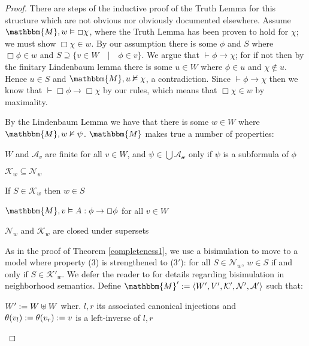 \begin{proof}
  
  
  There are steps of the inductive proof of the Truth Lemma for this structure
  which are not obvious nor obviously documented elsewhere.  Assume
  $\mathbbm{M}, w \vDash \Box \chi$, where the Truth Lemma has been proven to
  hold for $\chi$; we must show $\Box \chi \in w$.  By our assumption there
  is some $\phi$ and $S$ where $\Box \phi \in w$ and $S \supseteq \{v \in W
  \hspace{1em} | \hspace{1em} \phi \in v\}$.  We argue that $\vdash \phi
  \rightarrow \chi$; for if not then by the finitary Lindenbaum lemma there is
  some $u \in W$ where $\phi \in u$ and $\chi \nin u$.  Hence $u \in S$ and
  $\mathbbm{M}, u \nvDash \chi$, a contradiction.  Since $\vdash \phi
  \rightarrow \chi$ then we know that $\vdash \Box \phi \rightarrow \Box \chi$
  by our rules, which means that $\Box \chi \in w$ by maximality.
  
  
  
  By the Lindenbaum Lemma we have that there is some $w \in W$ where
  $\mathbbm{M}, w \nvDash \psi$.  $\mathbbm{M}$ makes true a number of
  properties:
  \begin{enumeratenumeric}
    \item $W$ and $\mathcal{A}_v$ are finite for all $v \in W$, and $\psi \in
    \bigcup \mathcal{A_w}$ only if $\psi$ is a subformula of $\phi$
    
    \item $\mathcal{K}_w \subseteq \mathcal{N}_w$
    
    \item If $S \in \mathcal{K}_w$ then $w \in S$
    
    \item $\mathbbm{M}, v \vDash A : \phi \rightarrow \Box \phi$ for all $v
    \in W$
    
    \item $\mathcal{N}_w$ and $\mathcal{K}_w$ are closed under supersets
  \end{enumeratenumeric}
  
  
  As in the proof of Theorem \ref{completeness1}, we use a bisimulation to
  move to a model where property (3) is strengthened to (3$'$): for all $S \in
  \mathcal{N}_w$, $w \in S$ if and only if $S \in \mathcal{K}'_w$.  We defer
  the reader to {\cite{hansen_bisimulation_2007,pauly_bisimulation_1999}} for
  details regarding bisimulation in neighborhood semantics.  Define
  $\mathbbm{M}' \assign \langle W', V', \mathcal{K}', \mathcal{N}',
  \mathcal{A}' \rangle$ such that:
  \begin{itemizedot}
    \item $W' := W \uplus W$ wher.  $l, r$ its associated canonical
    injections and $\theta (v_l) := \theta (v_r) := v$ is a
    left-inverse of $l, r$
    

\end{itemizedot}
\end{proof}
